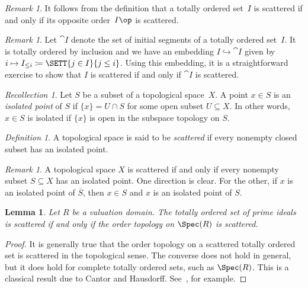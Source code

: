 \documentclass{amsart}
\numberwithin{equation}{section}%
\newtheorem{Lem}[equation]{Lemma}
\theoremstyle{remark}
\newtheorem{Def}[equation]{Definition}
\newtheorem{Rem}[equation]{Remark}
\newtheorem{Rec}[equation]{Recollection}
\begin{document}
\begin{Rem}
	It follows from the definition that a totally ordered set~$I$ is scattered if and only if its opposite order~$I\op$ is scattered.
\end{Rem}

\begin{Rem}\label{rem:initial-scattered}
	Let $\cat I$ denote the set of initial segments of a totally ordered set~$I$. It is totally ordered by inclusion and we have an embedding $I \hookrightarrow \cat I$ given by $i \mapsto I_{\le i} \coloneqq \SETT{j \in I}{j \le i}$. Using this embedding, it is a straightforward exercise to show that $I$ is scattered if and only if $\cat I$ is scattered.
\end{Rem}

\begin{Rec}\label{def:scattered}
	Let $S$ be a subset of a topological space~$X$. A point $x \in S$ is an \emph{isolated point} of $S$ if $\{x\} = U \cap S$ for some open subset $U \subseteq X$. In other words, $x \in S$ is isolated if $\{x\}$ is open in the subspace topology on $S$.

\end{Rec}

\begin{Def}
	A topological space is said to be \emph{scattered} if every nonempty closed subset has an isolated point.
\end{Def}

\begin{Rem}\label{rem:scattered-all-subsets}
	A topological space $X$ is scattered if and only if every nonempty subset $S \subseteq X$ has an isolated point. One direction is clear. For the other, if $x$ is an isolated point of $\overbar{S}$, then $x \in S$ and $x$ is an isolated point of $S$.
\end{Rem}

\begin{Lem}\label{lem:totally-scattered}
	Let $R$ be a valuation domain. The totally ordered set of prime ideals is scattered if and only if the order topology on $\Spec(R)$ is scattered.
\end{Lem}

\begin{proof}
	It is generally true that the order topology on a scattered totally ordered set is scattered in the topological sense. The converse does not hold in general, but it does hold for complete totally ordered sets, such as $\Spec(R)$. This is a classical result due to Cantor and Hausdorff. See~\cite[Section~2]{PouzetKaddourZaguia14}, for example.
\end{proof}
\end{document}
